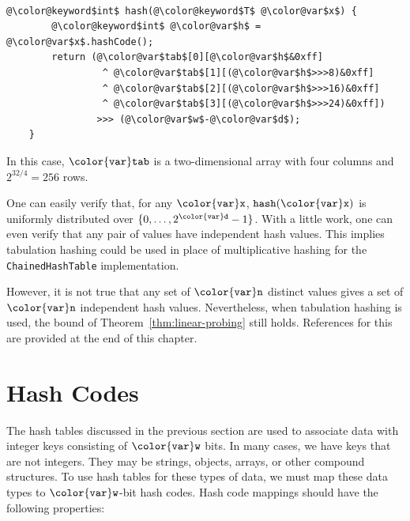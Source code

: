\documentclass[10pt]{book}
\theoremstyle{plain}
\newcommand{\thmref}[1]{Theorem~\ref{thm:#1}}
\theoremstyle{definition}
\begin{document}
 \ \vspace{.5ex}\begin{Verbatim}[gobble=1,tabsize=2,frame=single,framerule=1.2pt,commandchars=\\@\$,label=\texttt{LinearHashTable},labelposition=topline]
	@\color@keyword$int$ hash(@\color@keyword$T$ @\color@var$x$) {
		@\color@keyword$int$ @\color@var$h$ = @\color@var$x$.hashCode();
		return (@\color@var$tab$[0][@\color@var$h$&0xff] 
		         ^ @\color@var$tab$[1][(@\color@var$h$>>>8)&0xff]
		         ^ @\color@var$tab$[2][(@\color@var$h$>>>16)&0xff] 
		         ^ @\color@var$tab$[3][(@\color@var$h$>>>24)&0xff])
		  	    >>> (@\color@var$w$-@\color@var$d$);
	}
\end{Verbatim}

In this case, \ensuremath{\mathtt{{\color{var}tab}}} is a two-dimensional array with four columns and
$2^{32/4}=256$ rows.

One can easily verify that, for any \ensuremath{\mathtt{{\color{var}x}}}, \ensuremath{\mathtt{hash({\color{var}x})}} is uniformly
distributed over $\{0,\ldots,2^{\ensuremath{\mathtt{{\color{var}d}}}}-1\}$.  With a little work, one
can even verify that any pair of values have independent hash values.
This implies tabulation hashing could be used in place of multiplicative
hashing for the \texttt{ChainedHashTable} implementation.

However, it is not true that any set of \ensuremath{\mathtt{{\color{var}n}}} distinct values gives a set
of \ensuremath{\mathtt{{\color{var}n}}} independent hash values.  Nevertheless, when tabulation hashing is
used, the bound of \thmref{linear-probing} still holds.  References for
this are provided at the end of this chapter.

\section{Hash Codes}

%
The hash tables discussed in the previous section are used to associate
data with integer keys consisting of \ensuremath{\mathtt{{\color{var}w}}} bits.  In many cases, we
have keys that are not integers.  They may be strings, objects, arrays,
or other compound structures.  To use hash tables for these types of data,
we must map these data types to \ensuremath{\mathtt{{\color{var}w}}}-bit hash codes.  Hash code mappings should
have the following properties:
\end{document}
